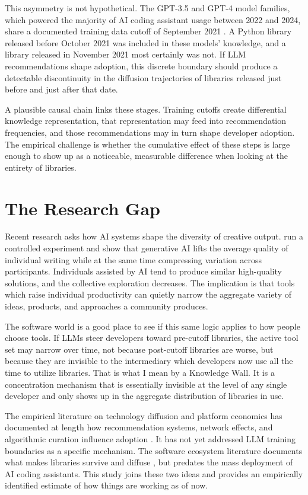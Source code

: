 \documentclass[12pt, a4paper]{report}
\begin{document}
This asymmetry is not hypothetical. The GPT-3.5 and GPT-4 model families, which powered the majority of AI coding assistant usage between 2022 and 2024, share a documented training data cutoff of September 2021 \citep{openai2023gpt4}. A Python library released before October 2021 was included in these models' knowledge, and a library released in November 2021 most certainly was not. If LLM recommendations shape adoption, this discrete boundary should produce a detectable discontinuity in the diffusion trajectories of libraries released just before and just after that date.

A plausible causal chain links these stages. Training cutoffs create differential knowledge representation, that representation may feed into recommendation frequencies, and those recommendations may in turn shape developer adoption. The empirical challenge is whether the cumulative effect of these steps is large enough to show up as a noticeable, measurable difference when looking at the entirety of libraries.

\section{The Research Gap}\label{sec:intro-gap}
Recent research asks how AI systems shape the diversity of creative output. \citet{doshi2024generative} run a controlled experiment and show that generative AI lifts the average quality of individual writing while at the same time compressing variation across participants. Individuals assisted by AI tend to produce similar high-quality solutions, and the collective exploration decreases. The implication is that tools which raise individual productivity can quietly narrow the aggregate variety of ideas, products, and approaches a community produces.

The software world is a good place to see if this same logic applies to how people choose tools. If LLMs steer developers toward pre-cutoff libraries, the active tool set may narrow over time, not because post-cutoff libraries are worse, but because they are invisible to the intermediary which developers now use all the time to utilize libraries. That is what I mean by a Knowledge Wall. It is a concentration mechanism that is essentially invisible at the level of any single developer and only shows up in the aggregate distribution of libraries in use.

The empirical literature on technology diffusion and platform economics has documented at length how recommendation systems, network effects, and algorithmic curation influence adoption \citep{bass1969new, rogers2003diffusion, kleinberg2021algorithmic, bommasani2022picking}. It has not yet addressed LLM training boundaries as a specific mechanism. The software ecosystem literature documents what makes libraries survive and diffuse \citep{borges2016understanding, borges2018whats}, but predates the mass deployment of AI coding assistants. This study joins these two ideas and provides an empirically identified estimate of how things are working as of now.
\end{document}
